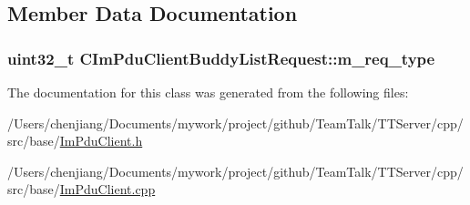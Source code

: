 \subsection{Member Data Documentation}
\hypertarget{class_c_im_pdu_client_buddy_list_request_ad2c68a1a8abf785f75f27624a27895a8}{}
\subsubsection[{m\+\_\+req\+\_\+type}]{\setlength{\rightskip}{0pt plus 5cm}uint32\+\_\+t C\+Im\+Pdu\+Client\+Buddy\+List\+Request\+::m\+\_\+req\+\_\+type\hspace{0.3cm}{\ttfamily [private]}}\label{class_c_im_pdu_client_buddy_list_request_ad2c68a1a8abf785f75f27624a27895a8}


The documentation for this class was generated from the following files\+:\begin{DoxyCompactItemize}
\item 
/\+Users/chenjiang/\+Documents/mywork/project/github/\+Team\+Talk/\+T\+T\+Server/cpp/src/base/\hyperlink{_im_pdu_client_8h}{Im\+Pdu\+Client.\+h}\item 
/\+Users/chenjiang/\+Documents/mywork/project/github/\+Team\+Talk/\+T\+T\+Server/cpp/src/base/\hyperlink{_im_pdu_client_8cpp}{Im\+Pdu\+Client.\+cpp}\end{DoxyCompactItemize}
